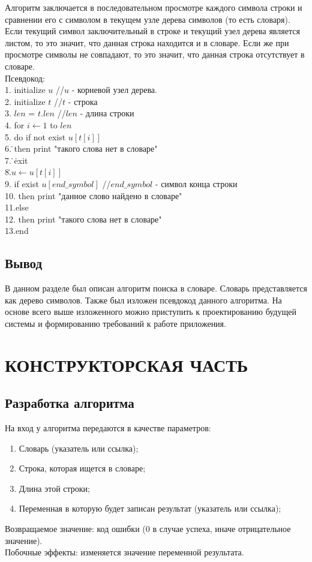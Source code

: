 \documentclass[a4paper,12pt]{article}
\begin{document}
Алгоритм заключается в последовательном просмотре каждого символа строки и сравнении его с символом в текущем узле дерева символов (то есть словаря). Если текущий символ заключительный в строке и текущий узел дерева является листом, то это значит, что данная строка находится и в словаре. Если же при просмотре символы не совпадают, то это значит, что данная строка отсутствует в словаре.\\
Псевдокод:\\
1. initialize $u$ \quad\quad //$u$ - корневой узел дерева.\\
2. initialize $t$ \quad\quad //$t$ - строка\\
3. $len$ = $t.len$ \quad\quad //$len$ - длина строки\\
4. for $i \leftarrow 1$ to $len$ \\
5. \quad do if not exist $u[t[i]]$\\
6. \quad\.\quad then print "такого слова нет в словаре"\\
7. \quad\.\quad\. exit\\
8.\.\quad $u \leftarrow u[t[i]]$\\
9. if exist $u[end\_symbol]$ \quad\quad //$end\_symbol$ - символ конца строки\\
10. \quad then print "данное слово найдено в словаре"\\
11.else \\
12. \quad then print "такого слова нет в словаре"\\
13.end \\

\newpage
\subsection{Вывод}
В данном разделе был описан алгоритм поиска в словаре. Словарь представляется как дерево символов. Также был изложен псевдокод данного алгоритма. На основе всего выше изложенного можно приступить к проектированию будущей системы и формированию требований к работе приложения.


\newpage
\section{КОНСТРУКТОРСКАЯ ЧАСТЬ}

\subsection{Разработка алгоритма}
На вход у алгоритма передаются в качестве параметров:
\begin{enumerate}
\item Словарь (указатель или ссылка);
\item Строка, которая ищется в словаре;
\item Длина этой строки;
\item Переменная в которую будет записан результат (указатель или ссылка);
\end{enumerate}
Возвращаемое значение: код ошибки (0 в случае успеха, иначе отрицательное значение). \\
Побочные эффекты: изменяется значение переменной результата.
\end{document}
